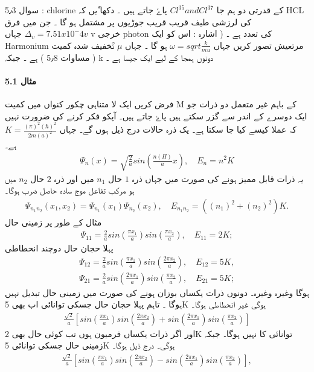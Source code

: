 سوال 5٫3 : chlorine کے قدرتی دو ہم جا 
$ Cl^35 and Cl^37 $ 
پاےٗ جاتے ہیں ۔ دکھا ٗیں کہ HCL کی لرزشی طیف قریب قریب   جوڑیوں پر مشتمل ہو گا ۔ جن میں فرق 
$ \Delta_v = 7.51 x {10}^-4 v $
جہاں v خرجی photon کی تعدد ہے ۔  ( اشارہ : اس کو ایک Harmonium مرتعیش تصور کریں جہاں 
$ \omega = sqrt{ \frac{ k }{ mu} } $
ہو گا ۔ جہاں 
$ \mu $
تؒخفیف شدہ کمیت ( مساوات 5٫8 ) ہے ۔ جبکہ k دونوں ہمجا کے لیے ایک جیسا ہے ۔ 




\paragraph*{مثال 5.1}
فرض کریں ایک لا متناہی چکور کنواں میں کمیت M کے باہم غیر متعمل دو ذرات جو ایک دوسرے کے اندر سے گزر سکتے ہیں پاۓ جاتے ہیں۔ آپکو فکر کرنے کی ضرورت نہیں کہ عملا کیسے کیا جا سکتا ہے۔ یک ذرہ حالات درج ذیل ہوں گے۔ جہاں $ K=\frac{(\pi)^2 (\hbar)^2}{2m(a)^2 }
$
ہے۔
\begin{align}
 \Psi_{n} (x)=\sqrt{\frac{2}{a}}sin(\frac{n (\Pi)}{a}x), \quad E_{n}=n^2 K 
\end{align}
یہ ذرات قابل ممیز ہونے کی صورت میں جہاں ذرہ $ 1 $ حال   $ n_{1} $ میں اور ذرہ $ 2 $ حال $ n_{2} $  میں ہو مرکب تفاعل موج سادہ حاصل ضرب ہوگا۔
\begin{align}
 \Psi_{n_{1} n_{2}} (x_{1},x_{2})=\Psi_{n_{1}}(x_{1})\Psi_{n_{2}}(x_{2}), \quad E_{n_{1} n_{2}}= ((n_{1})^2+(n_{2})^2)K. 
\end{align}
مثال کے طور پر زمینی حال
\begin{align}
 \Psi_{11}=\frac{2}{a}sin(\frac{\pi x_{1}}{a}) sin(\frac{\pi x_{2}}{a}), \quad E_{11}=2K; 
\end{align}
پہلا حجان حال دوچند انحطاطی 
\begin{align}
 \Psi_{12}=\frac{2}{a}sin(\frac{\pi x_{1}}{a}) sin(\frac{2\pi x_{2}}{a}), \quad E_{12}=5K, \\
\Psi_{21}=\frac{2}{a}sin(\frac{2\pi x_{1}}{a}) sin(\frac{\pi x_{2}}{a}), \quad E_{21}=5K; 
\end{align}
ہوگا وغیرہ وغیرہ۔ دونوں ذرات یکساں بوزان ہونے کی صورت میں زمینی حال تبدیل نہیں ہوگا ۔ تاہم پہلا حجان حال جسکی توانائی اب بھی 5K ہوگی غیر انحطاطی ہوگا۔
\begin{align}
\frac{\sqrt{2}}{a}[sin(\frac{\pi x_{1}}{a})sin(\frac{2\pi x_{2}}{a})+ sin(\frac{2 \pi x_{1}}{a})sin(\frac{\pi x_{2}}{a})]
\end{align} 
اور اگر ذرات یکساں فرمیون ہوں تب کوئی حال بھی 2K توانائی کا نہیں ہوگا۔ جبکہ زمینی حال جسکی توانائی 5K ہوگی۔ درج ذیل ہوگا۔
\begin{align}
\frac{\sqrt{2}}{a}[sin(\frac{\pi x_{1}}{a}) sin(\frac{2 \pi x_{2}}{a})- sin(\frac{2 \pi x_{1}}{a}) sin(\frac{\pi x_{2}}{a})], 
\end{align}

